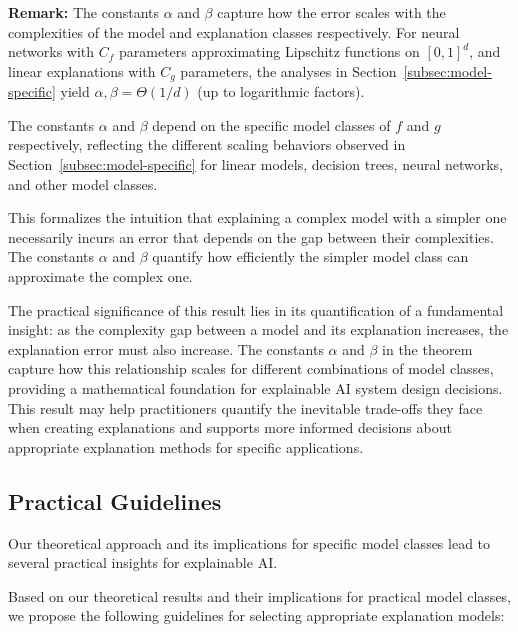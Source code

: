 \documentclass[11pt,letter,leqno]{article}
\begin{document}
\textbf{Remark:} The constants $\alpha$ and $\beta$ capture how the error scales with the 
complexities of the model and explanation classes respectively. For neural networks with 
$C_f$ parameters approximating Lipschitz functions on $[0,1]^d$, and linear explanations 
with $C_g$ parameters, the analyses in Section~\ref{subsec:model-specific} yield 
$\alpha, \beta = \Theta(1/d)$ (up to logarithmic factors).

The constants $\alpha$ and $\beta$ depend on the specific model classes of $f$ and $g$ respectively, reflecting the different scaling behaviors observed in Section~\ref{subsec:model-specific} for linear models, decision trees, neural networks, and other model classes.

This formalizes the intuition that explaining a complex model with a simpler one necessarily incurs an error that depends on the gap between their complexities. The constants $\alpha$ and $\beta$ quantify how efficiently the simpler model class can approximate the complex one.

The practical significance of this result lies in its quantification of a fundamental insight: as the complexity gap between a model and its explanation increases, the explanation error must also increase.  The constants $\alpha$ and $\beta$ in the theorem capture how this relationship scales for different combinations of model classes, providing a mathematical foundation for explainable AI system design decisions.  This result may help practitioners quantify the inevitable trade-offs they face when creating explanations and supports more informed decisions about appropriate explanation methods for specific applications.

\subsection{Practical Guidelines}
\label{subsec:practical-applications}

Our theoretical approach and its implications for specific model classes lead to several practical insights for explainable AI.

Based on our theoretical results and their implications for practical model classes, we propose the following guidelines for selecting appropriate explanation models:
\end{document}
